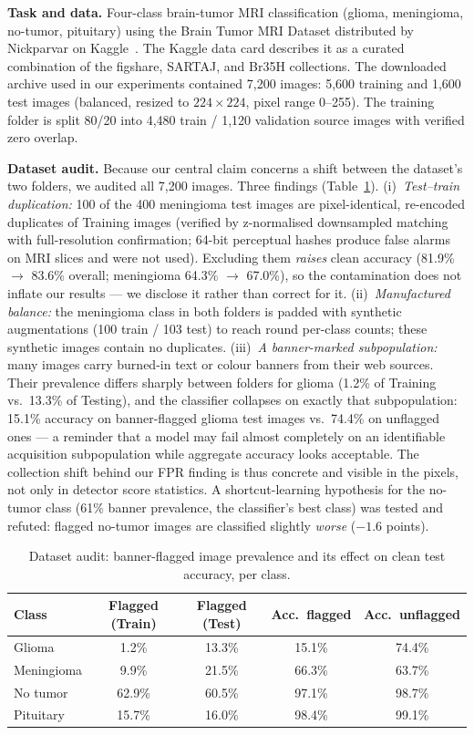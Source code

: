 \documentclass[runningheads]{llncs}
\begin{document}
\textbf{Task and data.} Four-class brain-tumor MRI classification
(glioma, meningioma, no-tumor, pituitary) using the Brain Tumor MRI
Dataset distributed by Nickparvar on Kaggle~\cite{nickparvar2021brain}. The
Kaggle data card describes it as a curated combination of the figshare,
SARTAJ, and Br35H collections. The
downloaded archive used in our experiments contained 7{,}200 images:
5{,}600 training and 1{,}600 test images (balanced, resized to
$224\times224$, pixel range 0--255). The training folder is split 80/20 into 4{,}480
train / 1{,}120 validation source images with verified zero overlap.

\textbf{Dataset audit.} Because our central claim concerns a shift
between the dataset's two folders, we audited all 7{,}200 images. Three
findings (Table~\ref{tab:audit}). (i)~\emph{Test--train duplication:}
100 of the 400 meningioma test images are pixel-identical, re-encoded
duplicates of Training images (verified by z-normalised downsampled
matching with full-resolution confirmation; 64-bit perceptual hashes
produce false alarms on MRI slices and were not used). Excluding them
\emph{raises} clean accuracy (81.9\% $\to$ 83.6\% overall; meningioma
64.3\% $\to$ 67.0\%), so the contamination does not inflate our
results --- we disclose it rather than correct for it.
(ii)~\emph{Manufactured balance:} the meningioma class in both folders
is padded with synthetic augmentations (100 train / 103 test) to reach
round per-class counts; these synthetic images contain no duplicates.
(iii)~\emph{A banner-marked subpopulation:} many images carry burned-in
text or colour banners from their web sources. Their prevalence differs
sharply between folders for glioma (1.2\% of Training vs.\ 13.3\% of
Testing), and the classifier collapses on exactly that subpopulation:
15.1\% accuracy on banner-flagged glioma test images vs.\ 74.4\% on
unflagged ones --- a reminder that a model may fail almost
completely on an identifiable acquisition subpopulation while aggregate
accuracy looks acceptable. The collection shift behind our FPR finding is thus
concrete and visible in the pixels, not only in detector score
statistics. A shortcut-learning hypothesis for the no-tumor class
(61\% banner prevalence, the classifier's best class) was tested and
refuted: flagged no-tumor images are classified slightly \emph{worse}
($-1.6$ points).

\begin{table}
\centering
\caption{Dataset audit: banner-flagged image prevalence and its effect
on clean test accuracy, per class.}
\label{tab:audit}
\begin{tabular}{lcccc}
\toprule
Class & Flagged (Train) & Flagged (Test) & Acc.\ flagged & Acc.\ unflagged \\
\midrule
Glioma     & 1.2\%  & 13.3\% & 15.1\% & 74.4\% \\
Meningioma & 9.9\%  & 21.5\% & 66.3\% & 63.7\% \\
No tumor   & 62.9\% & 60.5\% & 97.1\% & 98.7\% \\
Pituitary  & 15.7\% & 16.0\% & 98.4\% & 99.1\% \\
\bottomrule
\end{tabular}
\end{table}
\end{document}
